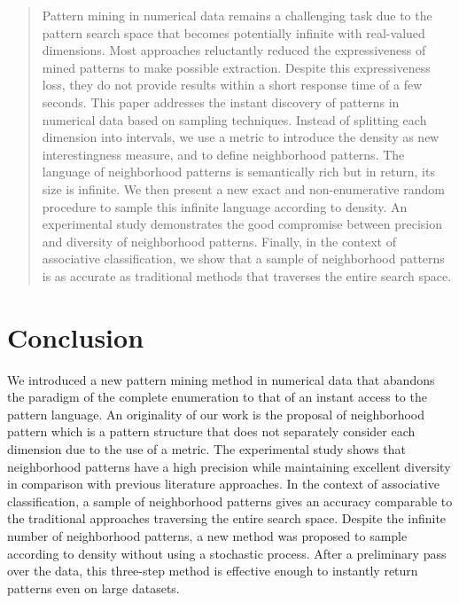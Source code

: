 \documentclass[twoside,leqno,twocolumn]{article}
\begin{document}
\begin{abstract}
Pattern mining in numerical data remains a challenging task due to the pattern search space that becomes potentially infinite with real-valued dimensions. Most approaches reluctantly reduced the expressiveness of mined patterns to make possible extraction. Despite this expressiveness loss, they do not provide results within a short response time of a few seconds. This paper addresses the instant discovery of patterns in numerical data based on sampling techniques. Instead of splitting each dimension into intervals, we use a metric to introduce the density as new interestingness measure, and to define neighborhood patterns. The language of neighborhood patterns is semantically rich but in return, its size is infinite. We then present a new exact and non-enumerative random procedure to sample this infinite language according to density. An experimental study demonstrates the good compromise between precision and diversity of neighborhood patterns. Finally, in the context of associative classification, we show that a sample of neighborhood patterns is as accurate as traditional methods that traverses the entire search space.
\end{abstract}





%


\section{Conclusion}
\label{sec:Conclusion}

We introduced a new pattern mining method in numerical data that abandons the paradigm of the complete enumeration to that of an instant access to the pattern language. An originality of our work is the proposal of neighborhood pattern which is a pattern structure that does not separately consider each dimension due to the use of a metric. The experimental study shows that neighborhood patterns have a high precision while maintaining excellent diversity in comparison with previous literature approaches. In the context of associative classification, a sample of neighborhood patterns gives an accuracy comparable to the traditional approaches traversing the entire search space. Despite the infinite number of neighborhood patterns, a new method was proposed to sample according to density without using a stochastic process. After a preliminary pass over the data, this three-step method is effective enough to instantly return patterns even on large datasets. 
\end{document}
